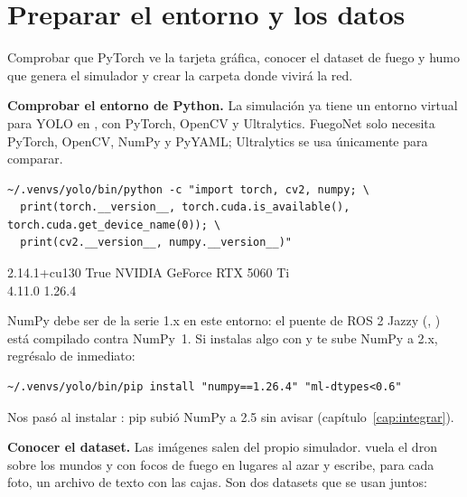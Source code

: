 \chapter{Preparar el entorno y los datos}
\label{cap:preparar}

\begin{enpocas}
Comprobar que PyTorch ve la tarjeta gráfica, conocer el dataset de fuego y humo
que genera el simulador y crear la carpeta donde vivirá la red.
\end{enpocas}

 \textbf{Comprobar el entorno de Python.}
La simulación ya tiene un entorno virtual para YOLO en , con
PyTorch, OpenCV y Ultralytics. FuegoNet solo necesita PyTorch, OpenCV, NumPy y
PyYAML; Ultralytics se usa únicamente para comparar.

\begin{lstlisting}[style=bash]
~/.venvs/yolo/bin/python -c "import torch, cv2, numpy; \
  print(torch.__version__, torch.cuda.is_available(), torch.cuda.get_device_name(0)); \
  print(cv2.__version__, numpy.__version__)"
\end{lstlisting}

\begin{resultado}
\ttfamily\small 2.14.1+cu130 True NVIDIA GeForce RTX 5060 Ti\\
4.11.0 1.26.4
\end{resultado}

\begin{aviso}
NumPy debe ser de la serie 1.x en este entorno: el puente de ROS 2 Jazzy
(, ) está compilado contra NumPy~1. Si instalas algo con
\cod{pip} y te sube NumPy a 2.x, regrésalo de inmediato:
\begin{lstlisting}[style=bash]
~/.venvs/yolo/bin/pip install "numpy==1.26.4" "ml-dtypes<0.6"
\end{lstlisting}
Nos pasó al instalar \cod{onnx}: pip subió NumPy a 2.5 sin avisar
(capítulo~\ref{cap:integrar}).
\end{aviso}

 \textbf{Conocer el dataset.}
Las imágenes salen del propio simulador. 
vuela el dron sobre los mundos  y  con focos de
fuego en lugares al azar y escribe, para cada foto, un archivo de texto con las
cajas. Son dos datasets que se usan juntos:

